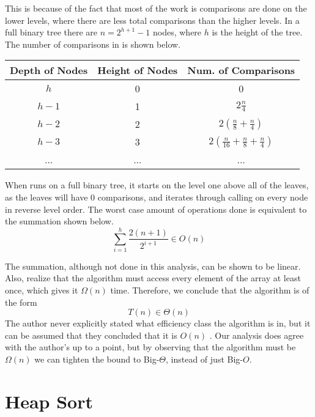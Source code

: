 \documentclass[11pt]{article}
\begin{document}
This is because of the fact that most of the work is comparisons are done on the lower levels, where there are less total comparisons than the higher levels. In a full binary tree there are $n=2^{h+1}-1$ nodes, where $h$ is the height of the tree. The number of comparisons in  is shown below.
\begin{center}
 \begin{tabular}{||c c c||} 
 \hline
 Depth of Nodes &  Height of Nodes & Num. of Comparisons \\ [0.5ex] 
 \hline
 \hline
 $h$ & 0 & 0 \\
 \hline 
 
 $h-1$ & 1 & $2 \frac{n}{4}$  \\ 
 \hline
 
 $h-2$ & 2 & $2(\frac{n}{8} + \frac{n}{4})$  \\
 \hline
 
 $h-3$ & 3 & $2(\frac{n}{16} + \frac{n}{8} + \frac{n}{4})$   \\
 \hline
 
 ... & ... & ...  \\
 \hline
\end{tabular}
\end{center}

When  runs on a full binary tree, it starts on the level one above all of the leaves, as the leaves will have 0 comparisons, and iterates through calling  on every node in reverse level order. The worst case amount of operations done is equivalent to the summation shown below.
\[
	\sum_{i=1}^{h}\frac{2(n+1)}{2^{i+1}} \in O(n)
\]


The summation, although not done in this analysis, can be shown to be linear. Also, realize that the algorithm must access every element of the array at least once, which gives it $\Omega(n)$ time. Therefore, we conclude that the algorithm is of the form
\[
	T(n)\in \Theta(n)
\]
The author never explicitly stated what efficiency class the algorithm is in, but it can be assumed that they concluded that it is $O(n)$ \cite[230]{levit}. Our analysis does agree with the author's up to a point, but by observing that the algorithm must be $\Omega(n)$ we can tighten the bound to Big-$\Theta$, instead of just Big-$O$.

\section{Heap Sort}
\end{document}
